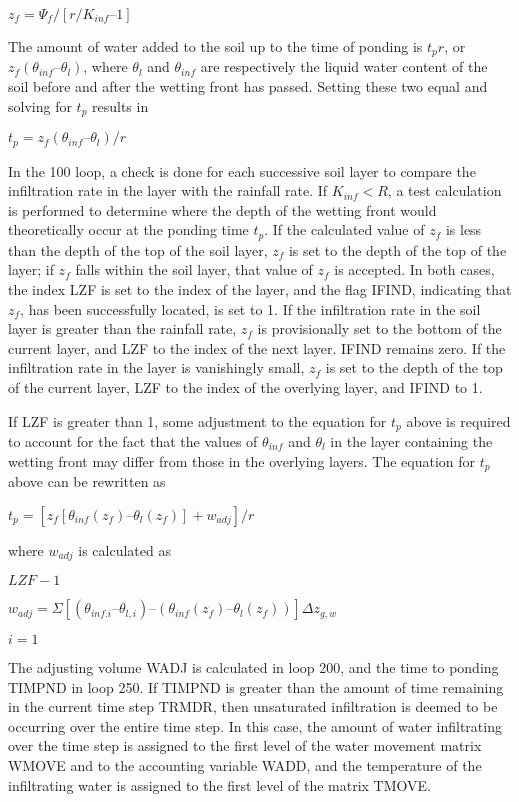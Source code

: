 $z_f = \Psi_f /[r/K_{inf} – 1]$

The amount of water added to the soil up to the time of ponding is $t_p r$, or $z_f (\theta_{inf} – \theta_l)$, where $\theta_l$ and $\theta_{inf}$ are respectively the liquid water content of the soil before and after the wetting front has passed. Setting these two equal and solving for $t_p$ results in

$t_p = z_f (\theta_{inf} – \theta_l)/r$

In the 100 loop, a check is done for each successive soil layer to compare the infiltration rate in the layer with the rainfall rate. If $K_{inf} < R$, a test calculation is performed to determine where the depth of the wetting front would theoretically occur at the ponding time $t_p$. If the calculated value of $z_f$ is less than the depth of the top of the soil layer, $z_f$ is set to the depth of the top of the layer; if $z_f$ falls within the soil layer, that value of $z_f$ is accepted. In both cases, the index L\+Z\+F is set to the index of the layer, and the flag I\+F\+I\+N\+D, indicating that $z_f$, has been successfully located, is set to 1. If the infiltration rate in the soil layer is greater than the rainfall rate, $z_f$ is provisionally set to the bottom of the current layer, and L\+Z\+F to the index of the next layer. I\+F\+I\+N\+D remains zero. If the infiltration rate in the layer is vanishingly small, $z_f$ is set to the depth of the top of the current layer, L\+Z\+F to the index of the overlying layer, and I\+F\+I\+N\+D to 1.

If L\+Z\+F is greater than 1, some adjustment to the equation for $t_p$ above is required to account for the fact that the values of $\theta_{inf}$ and $\theta_l$ in the layer containing the wetting front may differ from those in the overlying layers. The equation for $t_p$ above can be rewritten as

$t_p = [z_f [\theta_{inf}(z_f) – \theta_l(z_f)] + w_{adj}]/r$

where $w_{adj}$ is calculated as

$LZF-1$

$w_{adj} = \Sigma[(\theta_{inf. i} – \theta_{l,i} ) – (\theta_{inf} (z_f) – \theta_l (z_f))] \Delta z_{g,w}$

$i=1$

The adjusting volume W\+A\+D\+J is calculated in loop 200, and the time to ponding T\+I\+M\+P\+N\+D in loop 250. If T\+I\+M\+P\+N\+D is greater than the amount of time remaining in the current time step T\+R\+M\+D\+R, then unsaturated infiltration is deemed to be occurring over the entire time step. In this case, the amount of water infiltrating over the time step is assigned to the first level of the water movement matrix W\+M\+O\+V\+E and to the accounting variable W\+A\+D\+D, and the temperature of the infiltrating water is assigned to the first level of the matrix T\+M\+O\+V\+E.

